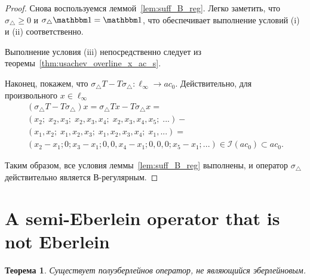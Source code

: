 \documentclass[a4paper,14pt]{article} %
\newcommand{\Iac}{\mathcal{I}(ac_0)}
\newcommand{\one}{\ensuremath{\mathbbm 1}}
\theoremstyle{plain}
\newtheorem{theorem}[lemma]{Теорема}
\begin{document}
	\begin{proof}
		Снова воспользуемся леммой~\ref{lem:suff_B_reg}.
		Легко заметить, что $\sigma_\triangle \geq 0$ и $\sigma_\triangle \one  = \one$,
		что обеспечивает выполнение условий (i) и (ii) соответственно.

		Выполнение условия (iii) непосредственно следует из теоремы~\ref{thm:usachev_overline_x_ac_s}.

		Наконец, покажем, что $\sigma_\triangle T - T \sigma_\triangle  : \ell_\infty \to ac_0$.
		Действительно, для произвольного $x\in\ell_\infty$
		\begin{multline}
		(\sigma_\triangle T - T \sigma_\triangle)x =
		\sigma_\triangle Tx - T \sigma_\triangle x =
		\\
		(x_2; \; x_2, x_3; \; x_2, x_3,   x_4; \; x_2, x_3, x_4, x_5; \; ... )-
		\\
		(x_1, x_2; \; x_1,    x_2, x_3; \; x_1,   x_2, x_3, x_4; \; x_1, ... )=
		\\
		(x_2-x_1; 0; x_3-x_1; 0, 0, x_4-x_1; 0,0,0; x_5-x_1; ...) \in\Iac\subset ac_0
		.
		\end{multline}

		Таким образом, все условия леммы~\ref{lem:suff_B_reg} выполнены,
		и оператор $\sigma_\triangle$ действительно является В-регулярным.
	\end{proof}



\section{A semi-Eberlein operator that is not Eberlein}
	\begin{theorem}
		\label{thm:amiable_but_not_Eberlein_exists}
		Существует полуэберлейнов оператор, не являющийся эберлейновым.
	\end{theorem}
\end{document}
